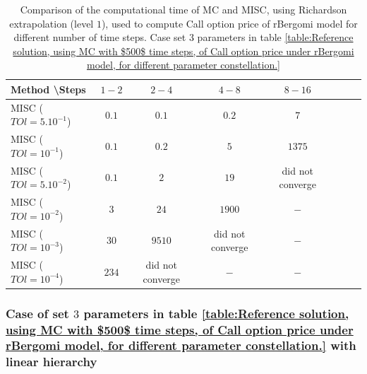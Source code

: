\documentclass[11pt]{article}
\begin{document}
\begin{table}[h!]
\centering
\begin{tabular}{l*{6}{c}r}
Method \textbackslash  Steps            & $1-2$ & $2-4$ & $4-8$ & $8-16$ &   \\
\hline
MISC ($TOl=5.10^{-1}$)  & $0.1$ & $0.1$ & $0.2$ & $7$  \\
MISC ($TOl=10^{-1}$)  & $0.1$ & $0.2$ & $5$ & $1375$  \\
MISC ($TOl=5.10^{-2}$)  & $0.1$ & $2$ & $19$ & did not converge \\
MISC ($TOl=10^{-2}$)  & $3$ & $24$ & $1900$ & $-$  \\	
MISC ($TOl=10^{-3}$)  & $30$ & $9510$ &did not converge & $-$  \\	
MISC ($TOl=10^{-4}$)  & $234$ &did not converge & $-$ & $-$  \\	
\hline
\end{tabular}
\caption{Comparison of the computational time of  MC and MISC, using Richardson extrapolation (level $1$), used to compute Call option price of rBergomi model for different number of time steps. Case set $3$ parameters in table \ref{table:Reference solution, using MC with $500$ time steps, of Call option price under rBergomi model, for different parameter constellation.}}
\label{Comparsion of the computational time of  MC and MISC, using Richardson extrapolation (level $1$), used to compute Call option price of rBergomi model for different number of time steps. Case set $3$ parameters}
\end{table}

\FloatBarrier



\subsubsection{Case of set $3$ parameters in table \ref{table:Reference solution, using MC with $500$ time steps, of Call option price under rBergomi model, for different parameter constellation.} with linear hierarchy}
\label{sec:Case of set $3$ parameters_linear}
\end{document}
